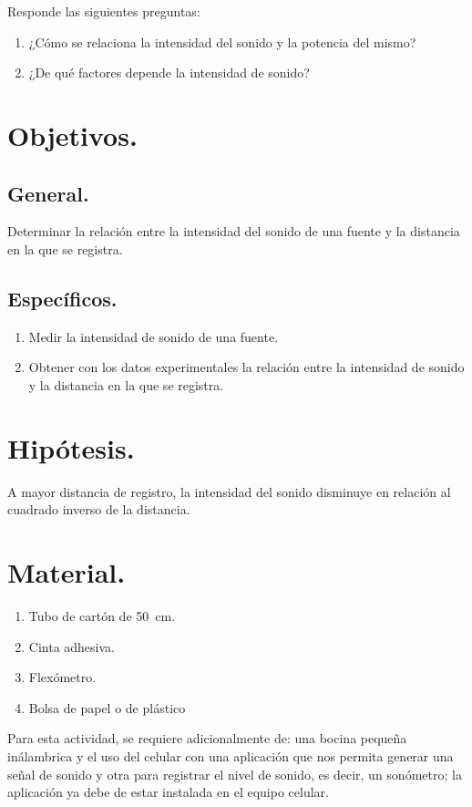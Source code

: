 \documentclass[14pt]{extarticle}
\begin{document}
Responde las siguientes preguntas:

\begin{enumerate}
\itemsep0.5em 
\item ¿Cómo se relaciona la intensidad del sonido y la potencia del mismo?
\item ¿De qué factores depende la intensidad de sonido?
\end{enumerate}

\section{Objetivos.}

\subsection{General.}

Determinar la relación entre la intensidad del sonido de una fuente y la distancia en la que se registra.

\subsection{Específicos.}

\begin{enumerate}
\item Medir la intensidad de sonido de una fuente.
\item Obtener con los datos experimentales la relación entre la intensidad de sonido y la distancia en la que se registra.
\end{enumerate}

\section{Hipótesis.}

A mayor distancia de registro, la intensidad del sonido disminuye en relación al cuadrado inverso de la distancia.

\section{Material.}

\begin{enumerate}
\itemsep0.15em 
\item Tubo de cartón de \SI{50}{\centi\meter}.
\item Cinta adhesiva.
\item Flexómetro.
\item Bolsa de papel o de plástico
\end{enumerate}
Para esta actividad, se requiere adicionalmente de: una bocina pequeña inálambrica y el uso del celular con una aplicación que nos permita generar una señal de sonido y otra para registrar el nivel de sonido, es decir, un sonómetro; la aplicación ya debe de estar instalada en el equipo celular. 
\end{document}
